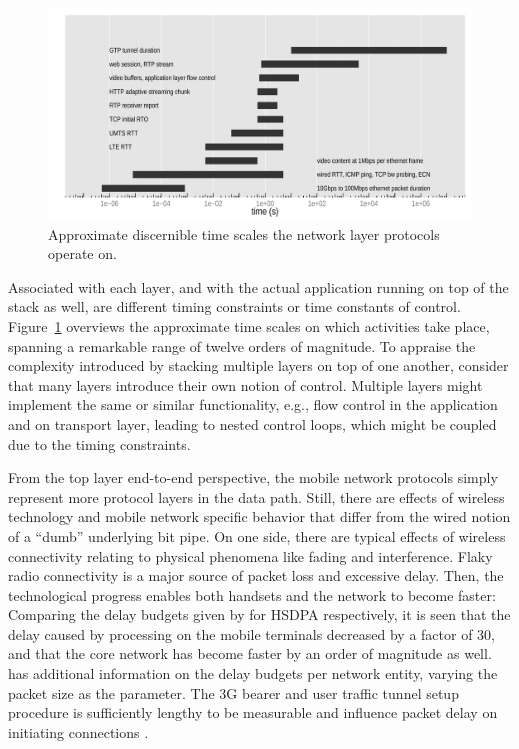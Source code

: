 \begin{figure}[htb]
	\centering
	\includegraphics[width=1.0\textwidth]{images/layer-timescales.pdf}
	\caption{Approximate discernible time scales the network layer protocols operate on.}
\label{c5:fig:timescales}
\end{figure}


Associated with each layer, and with the actual application running on top of the stack as well, are different timing constraints or time constants of control. Figure~\ref{c5:fig:timescales} overviews the approximate time scales on which activities take place, spanning a remarkable range of twelve orders of magnitude.
To appraise the complexity introduced by stacking multiple layers on top of one another, consider that many layers introduce their own notion of control. Multiple layers might implement the same or similar functionality, e.g., flow control in the application and on transport layer, leading to nested control loops, which might be coupled due to the timing constraints.


From the top layer end-to-end perspective, the mobile network protocols simply represent more protocol layers in the data path. Still, there are effects of wireless technology and mobile network specific behavior that differ from the wired notion of a ``dumb'' underlying bit pipe.
On one side, there are typical effects of wireless connectivity relating to physical phenomena like fading and interference. Flaky radio connectivity is a major source of packet loss and excessive delay. Then, the technological progress enables both handsets and the network to become faster: Comparing the delay budgets given by for \gls{HSDPA} respectively, it is seen that the delay caused by processing on the mobile terminals decreased by a factor of 30, and that the core network has become faster by an order of magnitude as well. \cite{laner2011dissecting3gdelay} has additional information on the delay budgets per network entity, varying the packet size as the parameter.
The \gls{3G} bearer and user traffic tunnel setup procedure is sufficiently lengthy to be measurable and influence packet delay on initiating connections \cite{arlos2010packetsizedelayinfluence}. 

